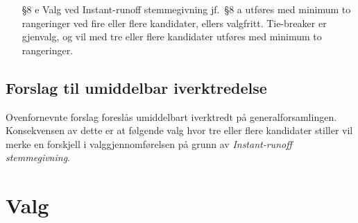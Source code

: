 \documentclass[10pt,norsk,a4paper]{article}
\begin{document}
\begin{enumerate}
	\item[§8 e] Valg ved Instant-runoff stemmegivning jf.~§8 a utføres med minimum to rangeringer ved fire eller flere kandidater, ellers valgfritt. Tie-breaker er gjenvalg, og vil med tre eller flere kandidater utføres med minimum to rangeringer.
\end{enumerate}


\subsection{Forslag til umiddelbar iverktredelse}

Ovenfornevnte forslag foreslås umiddelbart iverktredt på generalforsamlingen.
Konsekvensen av dette er at følgende valg hvor tre eller flere kandidater stiller vil merke en forskjell i valggjennomførelsen på grunn av \textit{Instant-runoff stemmegivning}.



\section{Valg}
\end{document}
